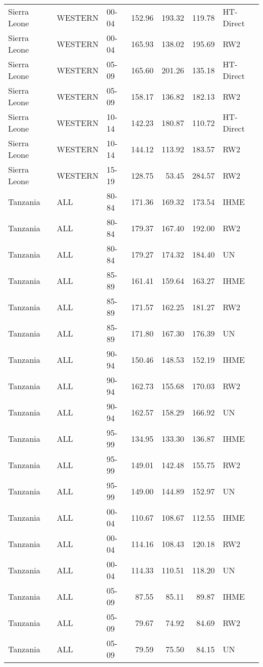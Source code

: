\begin{longtable}{lllrrrl}
  Sierra Leone & WESTERN & 00-04 & 152.96 & 193.32 & 119.78 & HT-Direct \\ 
  Sierra Leone & WESTERN & 00-04 & 165.93 & 138.02 & 195.69 & RW2 \\ 
  Sierra Leone & WESTERN & 05-09 & 165.60 & 201.26 & 135.18 & HT-Direct \\ 
  Sierra Leone & WESTERN & 05-09 & 158.17 & 136.82 & 182.13 & RW2 \\ 
  Sierra Leone & WESTERN & 10-14 & 142.23 & 180.87 & 110.72 & HT-Direct \\ 
  Sierra Leone & WESTERN & 10-14 & 144.12 & 113.92 & 183.57 & RW2 \\ 
  Sierra Leone & WESTERN & 15-19 & 128.75 & 53.45 & 284.57 & RW2 \\ 
  Tanzania & ALL & 80-84 & 171.36 & 169.32 & 173.54 & IHME \\ 
  Tanzania & ALL & 80-84 & 179.37 & 167.40 & 192.00 & RW2 \\ 
  Tanzania & ALL & 80-84 & 179.27 & 174.32 & 184.40 & UN \\ 
  Tanzania & ALL & 85-89 & 161.41 & 159.64 & 163.27 & IHME \\ 
  Tanzania & ALL & 85-89 & 171.57 & 162.25 & 181.27 & RW2 \\ 
  Tanzania & ALL & 85-89 & 171.80 & 167.30 & 176.39 & UN \\ 
  Tanzania & ALL & 90-94 & 150.46 & 148.53 & 152.19 & IHME \\ 
  Tanzania & ALL & 90-94 & 162.73 & 155.68 & 170.03 & RW2 \\ 
  Tanzania & ALL & 90-94 & 162.57 & 158.29 & 166.92 & UN \\ 
  Tanzania & ALL & 95-99 & 134.95 & 133.30 & 136.87 & IHME \\ 
  Tanzania & ALL & 95-99 & 149.01 & 142.48 & 155.75 & RW2 \\ 
  Tanzania & ALL & 95-99 & 149.00 & 144.89 & 152.97 & UN \\ 
  Tanzania & ALL & 00-04 & 110.67 & 108.67 & 112.55 & IHME \\ 
  Tanzania & ALL & 00-04 & 114.16 & 108.43 & 120.18 & RW2 \\ 
  Tanzania & ALL & 00-04 & 114.33 & 110.51 & 118.20 & UN \\ 
  Tanzania & ALL & 05-09 & 87.55 & 85.11 & 89.87 & IHME \\ 
  Tanzania & ALL & 05-09 & 79.67 & 74.92 & 84.69 & RW2 \\ 
  Tanzania & ALL & 05-09 & 79.59 & 75.50 & 84.15 & UN \\ 

\end{longtable}
